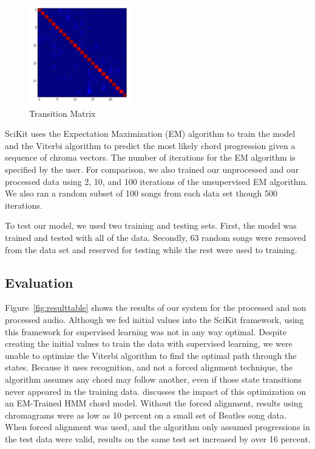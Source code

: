 \documentclass{article}
\begin{document}
\begin{figure}[h]
   \centering
   \includegraphics[width=0.4\textwidth]{trans-h.png}
   \caption{Transition Matrix}\label{fig:transmath}
\end{figure}

SciKit uses the Expectation Maximization (EM) algorithm to train the model and the
Viterbi algorithm to predict the most likely chord progression given a sequence
of chroma vectors. The number of iterations for the EM algorithm is specified by the user. For
comparison, we also trained our unprocessed and our processed data using 2,
10, and 100 iterations of the unsupervised EM algorithm. We also ran a random
subset of 100 songs from each data set though 500 iterations.

To test our model, we used two training and testing sets. First, the model was
trained and tested with all of the data. Secondly, 63 random songs were removed
from the data set and reserved for testing while the rest were used to
training.

\subsection{Evaluation}

Figure~\ref{fig:resulttable} shows the results of our system for the processed
and non processed audio. Although we fed initial values into the SciKit
framework, using this framework for supervised learning was not in any way
optimal.  Despite creating the initial values to train the data with supervised
learning, we were unable to optimize the Viterbi algorithm to find the optimal
path through the states. Because it uses recognition, and not a forced
alignment technique, the algorithm assumes any chord may follow another, even
if those state transitions never appeared in the training data.
\cite{Danellis:23} discusses the impact of this optimization on an EM-Trained
HMM chord model. Without the forced alignment, results using chromagrams were
as low as 10 percent on a small set of Beatles song data. When forced alignment
was used, and the algorithm only assumed progressions in the test data were
valid, results on the same test set increased by over 16 percent.
\end{document}
